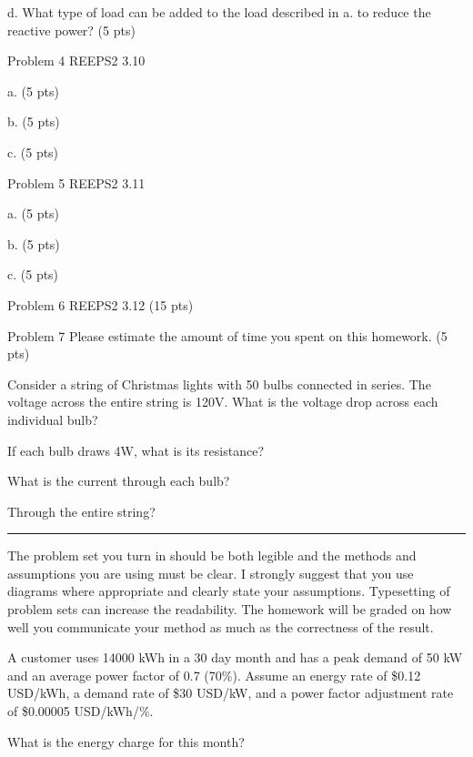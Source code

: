 \documentclass{article}
\begin{document}
d. What type of load can be added to the load described in a. to reduce
the reactive power? (5 pts)


 Problem 4
REEPS2 3.10

a. (5 pts)

b. (5 pts)

c. (5 pts)

 Problem 5
REEPS2 3.11

a. (5 pts)

b. (5 pts)

c. (5 pts)

 Problem 6
REEPS2 3.12 (15 pts)

 Problem 7
Please estimate the amount of time you spent on this homework. (5 pts)





\subproblem
Consider a string of Christmas lights with 50 bulbs connected in series.
The voltage across the entire string is 120V.  What is the voltage drop across
each individual bulb?

\subproblem
If each bulb draws 4W, what is its resistance?

\subproblem
What is the current through each bulb?

\subproblem
Through the entire string?


\hrule
\vspace{10pt}

The problem set you turn in should be both legible and the methods and
assumptions you are using must be clear.  I strongly suggest that you
use diagrams where appropriate and clearly state your assumptions.
Typesetting of problem sets can increase the readability.  The homework
will be graded on how well you communicate your method as much as the
correctness of the result.



A customer uses 14000 kWh in a 30 day month and has a peak demand of 50 kW and an
average power factor of 0.7 (70\%).  Assume an energy rate of \$0.12 USD/kWh, a
demand rate of \$30 USD/kW, and a power factor adjustment rate of
\$0.00005 USD/kWh/\%.

\subproblem
What is the energy charge for this month?

\end{document}
